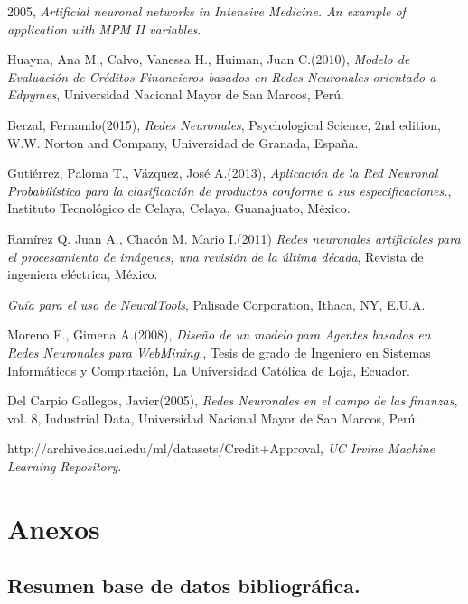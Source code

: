 \documentclass[11pt,titlepage]{report}
\begin{document}
\begin{thebibliography}{12}
2005, \textit{Artificial neuronal networks in Intensive Medicine. An example of application with MPM II variables}.

Huayna, Ana M., Calvo, Vanessa H., Huiman, Juan C.(2010), \textit{Modelo de Evaluación de Créditos Financieros basados en Redes Neuronales orientado a Edpymes}, Universidad Nacional Mayor de San Marcos, Perú.

Berzal, Fernando(2015), \textit{Redes Neuronales}, Psychological Science, 2nd edition, W.W. Norton and Company, Universidad de Granada, España.

Gutiérrez, Paloma T., Vázquez, José A.(2013), \textit{Aplicación de la Red Neuronal Probabilística para la clasificación
	de productos conforme a sus especificaciones.}, Instituto Tecnológico de Celaya, Celaya, Guanajuato, México.

Ramírez Q. Juan A., Chacón M. Mario I.(2011) \textit{Redes neuronales artificiales para el procesamiento de imágenes, una revisión de la última década}, Revista de ingeniera eléctrica, México.

\textit{Guía para el uso de NeuralTools}, Palisade Corporation, Ithaca, NY, E.U.A.

Moreno E., Gimena A.(2008), \textit{Diseño de un modelo para Agentes basados en Redes Neuronales para WebMining.}, Tesis de grado de Ingeniero en Sistemas Informáticos y Computación, La Universidad Católica de Loja, Ecuador.

Del Carpio Gallegos, Javier(2005), \textit{Redes Neuronales en el campo de las finanzas}, vol. 8,  Industrial Data, Universidad Nacional Mayor de San Marcos, Perú.

 \label{07}http://archive.ics.uci.edu/ml/datasets/Credit+Approval, \textit{UC Irvine Machine Learning Repository}.
\end{thebibliography}


\chapter{Anexos}


\section{Resumen base de datos bibliográfica.}
\end{document}
